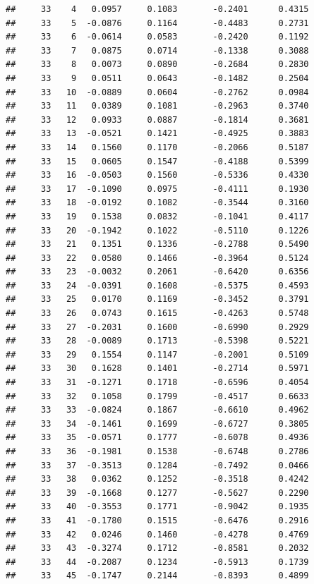 \documentclass[
]{article}
\begin{document}
\begin{verbatim}
##     33    4   0.0957     0.1083       -0.2401      0.4315  
##     33    5  -0.0876     0.1164       -0.4483      0.2731  
##     33    6  -0.0614     0.0583       -0.2420      0.1192  
##     33    7   0.0875     0.0714       -0.1338      0.3088  
##     33    8   0.0073     0.0890       -0.2684      0.2830  
##     33    9   0.0511     0.0643       -0.1482      0.2504  
##     33   10  -0.0889     0.0604       -0.2762      0.0984  
##     33   11   0.0389     0.1081       -0.2963      0.3740  
##     33   12   0.0933     0.0887       -0.1814      0.3681  
##     33   13  -0.0521     0.1421       -0.4925      0.3883  
##     33   14   0.1560     0.1170       -0.2066      0.5187  
##     33   15   0.0605     0.1547       -0.4188      0.5399  
##     33   16  -0.0503     0.1560       -0.5336      0.4330  
##     33   17  -0.1090     0.0975       -0.4111      0.1930  
##     33   18  -0.0192     0.1082       -0.3544      0.3160  
##     33   19   0.1538     0.0832       -0.1041      0.4117  
##     33   20  -0.1942     0.1022       -0.5110      0.1226  
##     33   21   0.1351     0.1336       -0.2788      0.5490  
##     33   22   0.0580     0.1466       -0.3964      0.5124  
##     33   23  -0.0032     0.2061       -0.6420      0.6356  
##     33   24  -0.0391     0.1608       -0.5375      0.4593  
##     33   25   0.0170     0.1169       -0.3452      0.3791  
##     33   26   0.0743     0.1615       -0.4263      0.5748  
##     33   27  -0.2031     0.1600       -0.6990      0.2929  
##     33   28  -0.0089     0.1713       -0.5398      0.5221  
##     33   29   0.1554     0.1147       -0.2001      0.5109  
##     33   30   0.1628     0.1401       -0.2714      0.5971  
##     33   31  -0.1271     0.1718       -0.6596      0.4054  
##     33   32   0.1058     0.1799       -0.4517      0.6633  
##     33   33  -0.0824     0.1867       -0.6610      0.4962  
##     33   34  -0.1461     0.1699       -0.6727      0.3805  
##     33   35  -0.0571     0.1777       -0.6078      0.4936  
##     33   36  -0.1981     0.1538       -0.6748      0.2786  
##     33   37  -0.3513     0.1284       -0.7492      0.0466  
##     33   38   0.0362     0.1252       -0.3518      0.4242  
##     33   39  -0.1668     0.1277       -0.5627      0.2290  
##     33   40  -0.3553     0.1771       -0.9042      0.1935  
##     33   41  -0.1780     0.1515       -0.6476      0.2916  
##     33   42   0.0246     0.1460       -0.4278      0.4769  
##     33   43  -0.3274     0.1712       -0.8581      0.2032  
##     33   44  -0.2087     0.1234       -0.5913      0.1739  
##     33   45  -0.1747     0.2144       -0.8393      0.4899  

\end{verbatim}
\end{document}
